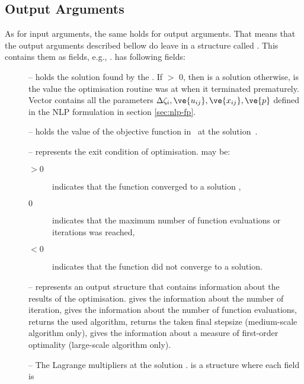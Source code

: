 \subsection{Output Arguments}
\label{sec:outarg}

As for input arguments, the same holds for output arguments. That
means that the output arguments described bellow do leave 
in a structure called . This contains them as fields,
e.g., .  has following fields: 
\begin{description}
\item[] -- holds the solution found by the
  . If  $>$ 0, then  is a
  solution  otherwise,  is the value the optimisation
  routine was at when it terminated prematurely. Vector 
  contains all the parameters $\Delta \zeta_{i}, \ve{u_{ij}},
  \ve{x_{ij}}, \ve{p}$ defined in the NLP formulation in section
  \ref{sec:nlp-fp}. 
\item[] -- holds the value of the objective
  function in~ at the solution~.
\item[] -- represents the exit condition of
  optimisation.  may be:
  \begin{description}
  \item[$>0$] indicates that the function converged to a solution
    , 
  \item[$0$] indicates that the maximum number of function evaluations
    or iterations was reached, 
  \item[$<0$] indicates that the function did not converge to a
    solution. 
  \end{description}
\item[] -- represents an output structure that contains
  information about the results of the
  optimisation.  gives the information about
  the number of iteration,  gives the
  information about the number of function  evaluations,
   returns the used algorithm,
   returns the taken final stepsize
  (medium-scale algorithm only),  gives
  the information about a measure of first-order optimality
  (large-scale algorithm only). 
\item[] -- The Lagrange multipliers at the solution
  .  is a structure where each field is

\end{description}
